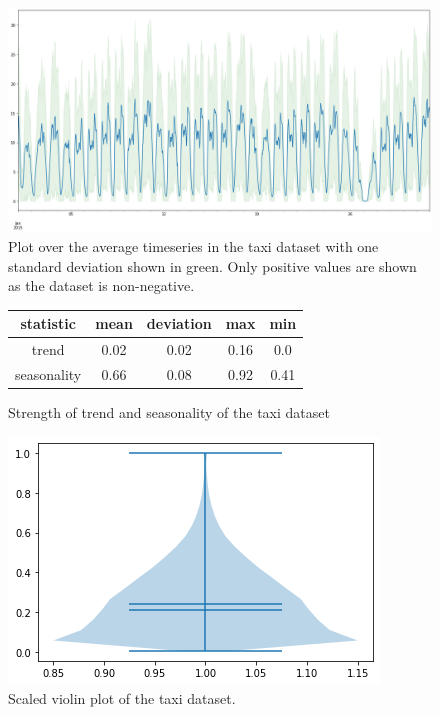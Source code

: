 \begin{figure}[htb]
  \centering
  \includegraphics[width=\linewidth]{./img/taxi_30min_plot.png}
  \caption{Plot over the average timeseries in the taxi dataset with one standard deviation shown in green. Only positive values are shown as the dataset is non-negative.}
  \label{fig:taxi_30min_plot}
  \endminipage\hfill
\end{figure}

\begin{figure}[htb]
  \centering
  \begin{center}
    \begin{tabular}{||c | c | c | c | c |}
      \hline
      statistic   & mean & deviation & max  & min  \\
      \hline
      trend       & 0.02 & 0.02      & 0.16 & 0.0  \\
      \hline
      seasonality & 0.66 & 0.08      & 0.92 & 0.41 \\
      \hline
      \hline
    \end{tabular}
    \caption{Strength of trend and seasonality of the taxi dataset}
  \end{center}
  \endminipage\hfill
  \includegraphics[width=\linewidth]{./img/taxi_30min_violin.png}
  \caption{Scaled violin plot of the taxi dataset.}
  \label{fig:taxi_30min_violin}
  \endminipage\hfill
\end{figure}

